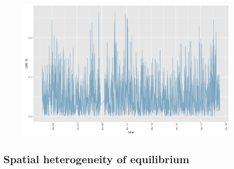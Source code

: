 \begin{figure}
\includegraphics[width=\textwidth]{Figures/TransportationEquilibrium/gr4}
\caption{}
\label{fig:fig-4}
\end{figure}





\subsection{Spatial heterogeneity of equilibrium} %



